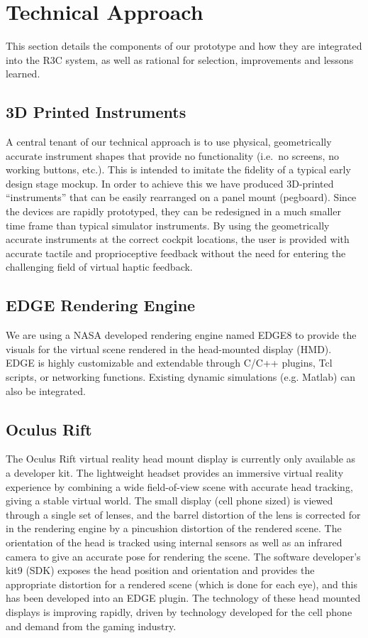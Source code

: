 \section{Technical Approach}

This section details the components of our prototype and how they are integrated into the R3C system, as well as rational for selection, improvements and lessons learned.

\subsection{3D Printed Instruments}

A central tenant of our technical approach is to use physical, geometrically accurate instrument shapes that provide no functionality (i.e.\ no screens, no working buttons, etc.).
This is intended to imitate the fidelity of a typical early design stage mockup.
In order to achieve this we have produced 3D-printed ``instruments'' that can be easily rearranged on a panel mount (pegboard).
Since the devices are rapidly prototyped, they can be redesigned in a much smaller time frame than typical simulator instruments.
By using the geometrically accurate instruments at the correct cockpit locations, the user is provided with accurate tactile and proprioceptive feedback without the need for entering the challenging field of virtual haptic feedback.

\subsection{EDGE Rendering Engine}

We are using a NASA developed rendering engine named EDGE8 to provide the visuals for the virtual scene rendered in the head-mounted display (HMD).
EDGE is highly customizable and extendable through C/C++ plugins, Tcl scripts, or networking functions.
Existing dynamic simulations (e.g. Matlab) can also be integrated.

\subsection{Oculus Rift}

The Oculus Rift virtual reality head mount display is currently only available as a developer kit.
The lightweight headset provides an immersive virtual reality experience by combining a wide field-of-view scene with accurate head tracking, giving a stable virtual world.
The small display (cell phone sized) is viewed through a single set of lenses, and the barrel distortion of the lens is corrected for in the rendering engine by a pincushion distortion of the rendered scene.
The orientation of the head is tracked using internal sensors as well as an infrared camera to give an accurate pose for rendering the scene.
The software developer’s kit9 (SDK) exposes the head position and orientation and provides the appropriate distortion for a rendered scene (which is done for each eye), and this has been developed into an EDGE plugin.
The technology of these head mounted displays is improving rapidly, driven by technology developed for the cell phone and demand from the gaming industry.

